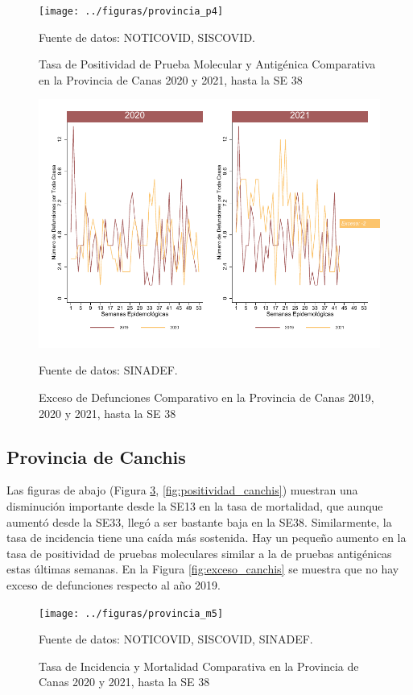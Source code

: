 \documentclass[12pt,a4paper,openany]{book}
\begin{document}
	\begin{figure}[h]
	\caption{Tasa de Positividad de Prueba Molecular y Antigénica Comparativa en la Provincia de Canas 2020 y 2021, hasta la SE 38}\label{fig:positividad_calca}
	\begin{center}
		\texttt{[image: ../figuras/provincia\_p4]}
	\end{center}
	{\footnotesize {Fuente de datos: NOTICOVID, SISCOVID.}}
	\end{figure}

	\begin{figure}[h]
	\caption{Exceso de Defunciones Comparativo en la Provincia de Canas 2019, 2020 y 2021, hasta la SE 38}\label{fig:exceso_calca}
	\begin{center}
		\includegraphics[width=0.7\linewidth]{../figuras/exceso_4}
	\end{center}
	{\footnotesize {Fuente de datos: SINADEF.}}
	\end{figure}

\clearpage

	\subsection*{Provincia de Canchis}
	\noindent Las figuras de abajo (Figura \ref{fig:inc_mort_canchis}, \ref{fig:positividad_canchis})  muestran una disminución importante desde la SE13 en la tasa de mortalidad, que aunque aumentó desde la SE33, llegó a ser bastante baja en la SE38. Similarmente, la tasa de incidencia tiene una caída más sostenida. Hay un pequeño aumento en la tasa de positividad de pruebas moleculares similar a la de pruebas antigénicas estas últimas semanas. En la Figura \ref{fig:exceso_canchis} se muestra que no hay exceso de defunciones respecto al año 2019.

	\begin{figure}[h]
	\caption{Tasa de Incidencia y Mortalidad Comparativa en la Provincia de Canas 2020 y 2021, hasta la SE 38}\label{fig:inc_mort_canchis}
	\begin{center}
		\texttt{[image: ../figuras/provincia\_m5]}
	\end{center}
	{\footnotesize {Fuente de datos: NOTICOVID, SISCOVID, SINADEF.}}
	\end{figure}
\end{document}
